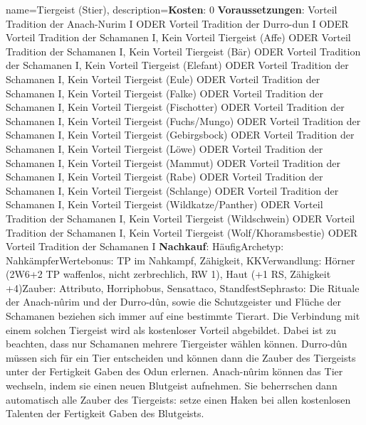 {
    name={Tiergeist (Stier)},
    description={\textbf{Kosten}: 0 \textbf{Voraussetzungen}: Vorteil Tradition der Anach-Nurim I ODER Vorteil Tradition der Durro-dun I ODER Vorteil Tradition der Schamanen I, Kein Vorteil Tiergeist (Affe) ODER Vorteil Tradition der Schamanen I, Kein Vorteil Tiergeist (Bär) ODER Vorteil Tradition der Schamanen I, Kein Vorteil Tiergeist (Elefant) ODER Vorteil Tradition der Schamanen I, Kein Vorteil Tiergeist (Eule) ODER Vorteil Tradition der Schamanen I, Kein Vorteil Tiergeist (Falke) ODER Vorteil Tradition der Schamanen I, Kein Vorteil Tiergeist (Fischotter) ODER Vorteil Tradition der Schamanen I, Kein Vorteil Tiergeist (Fuchs/Mungo) ODER Vorteil Tradition der Schamanen I, Kein Vorteil Tiergeist (Gebirgsbock) ODER Vorteil Tradition der Schamanen I, Kein Vorteil Tiergeist (Löwe) ODER Vorteil Tradition der Schamanen I, Kein Vorteil Tiergeist (Mammut) ODER Vorteil Tradition der Schamanen I, Kein Vorteil Tiergeist (Rabe) ODER Vorteil Tradition der Schamanen I, Kein Vorteil Tiergeist (Schlange) ODER Vorteil Tradition der Schamanen I, Kein Vorteil Tiergeist (Wildkatze/Panther) ODER Vorteil Tradition der Schamanen I, Kein Vorteil Tiergeist (Wildschwein) ODER Vorteil Tradition der Schamanen I, Kein Vorteil Tiergeist (Wolf/Khoramsbestie) ODER Vorteil Tradition der Schamanen I \textbf{Nachkauf}: Häufig\newline Archetyp: Nahkämpfer\newline Wertebonus: TP im Nahkampf, Zähigkeit, KK\newline Verwandlung: Hörner (2W6+2 TP waffenlos, nicht zerbrechlich, RW 1), Haut (+1 RS, Zähigkeit +4)\newline Zauber: Attributo, Horriphobus, Sensattaco, Standfest\newline Sephrasto: Die Rituale der Anach-nûrim und der Durro-dûn, sowie die Schutzgeister und Flüche der Schamanen beziehen sich immer auf eine bestimmte Tierart. Die Verbindung mit einem solchen Tiergeist wird als kostenloser Vorteil abgebildet. Dabei ist zu beachten, dass nur Schamanen mehrere Tiergeister wählen können. Durro-dûn müssen sich für ein Tier entscheiden und können dann die Zauber des Tiergeists unter der Fertigkeit Gaben des Odun erlernen. Anach-nûrim können das Tier wechseln, indem sie einen neuen Blutgeist aufnehmen. Sie beherrschen dann automatisch alle Zauber des Tiergeists: setze einen Haken bei allen kostenlosen Talenten der Fertigkeit Gaben des Blutgeists.}
}


